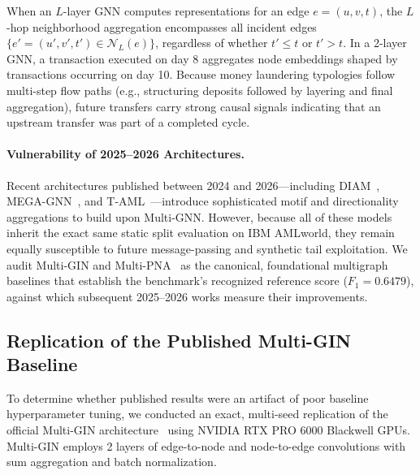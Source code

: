 \documentclass[10pt,twocolumn,letterpaper]{article}
\begin{document}
When an $L$-layer GNN computes representations for an edge $e=(u,v,t)$, the $L$-hop neighborhood aggregation encompasses all incident edges $\{e'=(u',v',t') \in \mathcal{N}_L(e)\}$, regardless of whether $t' \le t$ or $t' > t$. In a 2-layer GNN, a transaction executed on day 8 aggregates node embeddings shaped by transactions occurring on day 10. Because money laundering typologies follow multi-step flow paths (e.g., structuring deposits followed by layering and final aggregation), future transfers carry strong causal signals indicating that an upstream transfer was part of a completed cycle. 

\paragraph{Vulnerability of 2025--2026 Architectures.} Recent architectures published between 2024 and 2026—including DIAM~\cite{ding2024diam}, MEGA-GNN~\cite{bilgi2026mega}, and T-AML~\cite{rico2026taml}—introduce sophisticated motif and directionality aggregations to build upon Multi-GNN. However, because all of these models inherit the exact same static split evaluation on IBM AMLworld, they remain equally susceptible to future message-passing and synthetic tail exploitation. We audit Multi-GIN and Multi-PNA~\cite{egressy2024multigraph} as the canonical, foundational multigraph baselines that establish the benchmark's recognized reference score ($F_1 = 0.6479$), against which subsequent 2025--2026 works measure their improvements.

\subsection{Replication of the Published Multi-GIN Baseline}
To determine whether published results were an artifact of poor baseline hyperparameter tuning, we conducted an exact, multi-seed replication of the official Multi-GIN architecture~\cite{egressy2024multigraph} using NVIDIA RTX PRO 6000 Blackwell GPUs. Multi-GIN employs 2 layers of edge-to-node and node-to-edge convolutions with sum aggregation and batch normalization.
\end{document}
